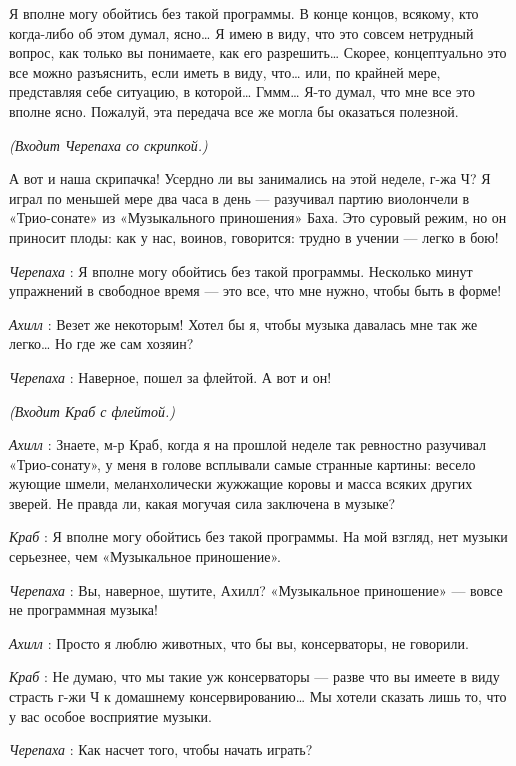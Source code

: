 \documentclass[../main.tex]{subfiles}
\begin{document}
\begin{dialogue}

 Я вполне могу обойтись без такой программы. В конце концов, всякому, кто когда-либо об этом думал, ясно\ldots{} Я имею в виду, что это совсем нетрудный вопрос, как только вы понимаете, как его разрешить\ldots{} Скорее, концептуально это все можно разъяснить, если иметь в виду, что\ldots{} или, по крайней мере, представляя себе ситуацию, в которой\ldots{} Гммм\ldots{} Я-то думал, что мне все это вполне ясно. Пожалуй, эта передача все же могла бы оказаться полезной.

\emph{(Входит Черепаха со скрипкой.)}

А вот и наша скрипачка! Усердно ли вы занимались на этой неделе, г-жа Ч? Я играл по меньшей мере два часа в день --- разучивал партию виолончели в «Трио-сонате» из «Музыкального приношения» Баха. Это суровый режим, но он приносит плоды: как у нас, воинов, говорится: трудно в учении --- легко в бою!

\emph{Черепаха} : Я вполне могу обойтись без такой программы. Несколько минут упражнений в свободное время --- это все, что мне нужно, чтобы быть в форме!

\emph{Ахилл} : Везет же некоторым! Хотел бы я, чтобы музыка давалась мне так же легко\ldots{} Но где же сам хозяин?

\emph{Черепаха} : Наверное, пошел за флейтой. А вот и он!

\emph{(Входит Краб с флейтой.)}

\emph{Ахилл} : Знаете, м-р Краб, когда я на прошлой неделе так ревностно разучивал «Трио-сонату», у меня в голове всплывали самые странные картины: весело жующие шмели, меланхолически жужжащие коровы и масса всяких других зверей. Не правда ли, какая могучая сила заключена в музыке?

\emph{Краб} : Я вполне могу обойтись без такой программы. На мой взгляд, нет музыки серьезнее, чем «Музыкальное приношение».

\emph{Черепаха} : Вы, наверное, шутите, Ахилл? «Музыкальное приношение» --- вовсе не программная музыка!

\emph{Ахилл} : Просто я люблю животных, что бы вы, консерваторы, не говорили.

\emph{Краб} : Не думаю, что мы такие уж консерваторы --- разве что вы имеете в виду страсть г-жи Ч к домашнему консервированию\ldots{} Мы хотели сказать лишь то, что у вас особое восприятие музыки.

\emph{Черепаха} : Как насчет того, чтобы начать играть?


\end{dialogue}
\end{document}
